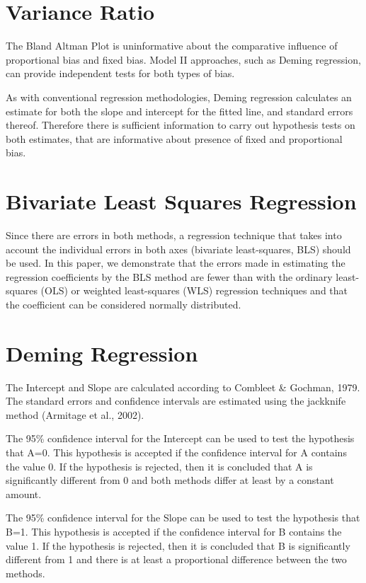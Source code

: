 \documentclass[12pt, a4paper]{report}
\theoremstyle{plain}
\theoremstyle{definition}
\theoremstyle{remark}
\begin{document}
\section{Variance Ratio}
The Bland Altman Plot is uninformative about the comparative influence of proportional bias and fixed bias. Model II approaches, such as Deming regression,  can provide independent tests for
both types of bias.


As with conventional regression methodologies, Deming regression calculates an estimate for both the slope and intercept for the
fitted line, and standard errors thereof. Therefore there is sufficient information to carry out hypothesis tests on both
estimates, that are informative about presence of fixed and proportional bias.

\section{Bivariate Least Squares Regression} Since there
are errors in both methods, a regression technique that takes into account the individual errors in both axes (bivariate least-squares, BLS) should be used. In this paper, we demonstrate that the errors made in estimating the regression coefficients by the BLS method are fewer than with the ordinary least-squares (OLS) or weighted least-squares (WLS) regression techniques and that the coefficient can be considered normally distributed.




\section{Deming Regression}
The Intercept and Slope are calculated according to Combleet \& Gochman, 1979. The standard errors and confidence intervals are estimated using the jackknife method (Armitage et al., 2002).

The 95\% confidence interval for the Intercept can be used to test the hypothesis that A=0. This hypothesis is accepted if the confidence interval for A contains the value 0. If the hypothesis is rejected, then it is concluded that A is significantly different from 0 and both methods differ at least by a constant amount.

The 95\% confidence interval for the Slope can be used to test the hypothesis that B=1. This hypothesis is accepted if the confidence interval for B contains the value 1. If the hypothesis is rejected, then it is concluded that B is significantly different from 1 and there is at least a proportional difference between the two methods.
\end{document}
